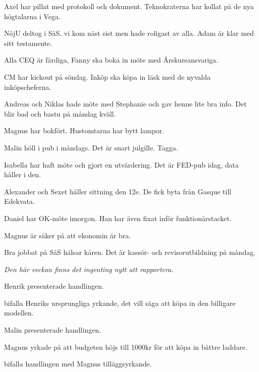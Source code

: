 \documentclass[10pt]{article}
\begin{document}
\begin{paragrafer}
\begin{paragrafer}

		Axel har pillat med protokoll och dokument. Teknokraterna har kollat på de nya högtalarna i Vega.

		NöjU deltog i SåS, vi kom näst sist men hade roligast av alla. Adam är klar med sitt testamente.

		Alla CEQ är färdiga, Fanny ska boka in möte med Årskursansvariga. 

		CM har kickout på söndag. Inköp ska köpa in läsk med de nyvalda inköpscheferna.

		Andreas och Niklas hade möte med Stephanie och gav henne lite bra info. Det blir bad och bastu på måndag kväll.

		Magnus har bokfört. Hustomtarna har bytt lampor.

		Malin höll i pub i måndags. Det är snart julgille. Tagga.

		Isabella har haft möte och gjort en utvärdering. Det är FED-pub idag, data håller i den.

		Alexander och Sexet håller sittning den 12e. De fick byta från Gasque till Edekvata. 
		
		Daniel har OK-möte imorgon. Han har även fixat inför funktionärstacket. 


		Magnus är säker på att ekonomin är bra. 


		Bra jobbat på SåS hälsar kåren. Det är kassör- och revisorutbildning på måndag.


		\emph{Den här veckan finns det ingenting nytt att rapportera.}

	\end{paragrafer}


		Henrik presenterade handlingen. 

		\Mba bifalla Henriks ursprungliga yrkande, det vill säga att köpa in den billigare modellen.

	
	Malin presenterade handlingen.

	Magnus yrkade på att budgeten höjs till 1000kr för att köpa in bättre laddare.

	\Mba bifalla handlingen med Magnus tilläggsyrkande. 


\end{paragrafer}
\end{document}
